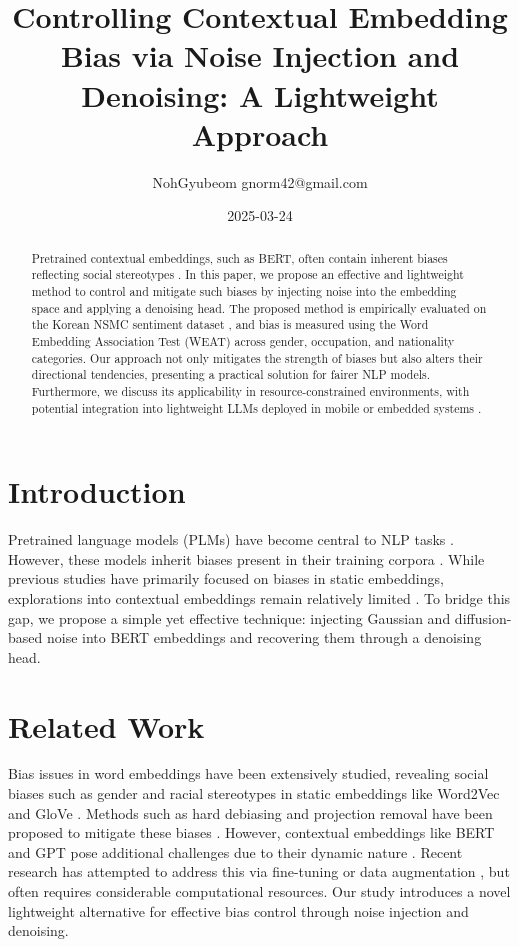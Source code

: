\documentclass{article}
\title{\textbf{\LARGE Controlling Contextual Embedding Bias via Noise Injection and Denoising: A Lightweight Approach}}
\author{NohGyubeom gnorm42@gmail.com}
\date{2025-03-24}
\begin{document}
\maketitle

\begin{abstract}
Pretrained contextual embeddings, such as BERT, often contain inherent biases reflecting social stereotypes \cite{sheng2019, kurita2019}. In this paper, we propose an effective and lightweight method to control and mitigate such biases by injecting noise into the embedding space and applying a denoising head. The proposed method is empirically evaluated on the Korean NSMC sentiment dataset \cite{nsmc2016}, and bias is measured using the Word Embedding Association Test (WEAT) \cite{caliskan2017, may2019} across gender, occupation, and nationality categories. Our approach not only mitigates the strength of biases but also alters their directional tendencies, presenting a practical solution for fairer NLP models. Furthermore, we discuss its applicability in resource-constrained environments, with potential integration into lightweight LLMs deployed in mobile or embedded systems \cite{sun2020mobilebert, lan2019albert}.
\end{abstract}

\section{Introduction}
Pretrained language models (PLMs) have become central to NLP tasks \cite{devlin2019, raffel2020}. However, these models inherit biases present in their training corpora \cite{bender2021, gehman2020}. While previous studies have primarily focused on biases in static embeddings, explorations into contextual embeddings remain relatively limited \cite{bolukbasi2016, manzini2019}. To bridge this gap, we propose a simple yet effective technique: injecting Gaussian and diffusion-based noise into BERT embeddings and recovering them through a denoising head.

\section{Related Work}
Bias issues in word embeddings have been extensively studied, revealing social biases such as gender and racial stereotypes in static embeddings like Word2Vec and GloVe \cite{mikolov2013, pennington2014, bolukbasi2016, manzini2019}. Methods such as hard debiasing and projection removal have been proposed to mitigate these biases \cite{bolukbasi2016}. However, contextual embeddings like BERT and GPT pose additional challenges due to their dynamic nature \cite{kurita2019}. Recent research has attempted to address this via fine-tuning or data augmentation \cite{zmigrod2019, zhao2018}, but often requires considerable computational resources. Our study introduces a novel lightweight alternative for effective bias control through noise injection and denoising.
\end{document}
